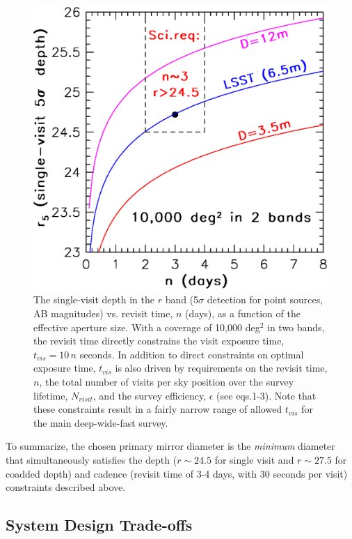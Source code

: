 \documentclass{emulateapj}
\begin{document}
\begin{figure}[t]
\includegraphics[width=1.0\hsize,clip]{singleDepth.ps}
\caption{The single-visit depth in the $r$ band (5$\sigma$ detection for 
point sources, AB magnitudes) vs. revisit time, $n$ (days), as a function of 
the effective aperture size. With a coverage of 10,000 deg$^2$ in two bands, 
the revisit time directly constrains the visit exposure time, $t_{vis}=10\,n$ 
seconds. In addition to direct constraints on optimal exposure time, $t_{vis}$ 
is also driven by requirements on the revisit time, $n$, the total number of visits 
per sky position over the survey lifetime, $N_{visit}$, and the survey efficiency,
$\epsilon$ (see eqs.1-3). Note that these constraints result in a fairly narrow range of 
allowed $t_{vis}$ for the main deep-wide-fast survey.} 
\label{Fig:singleDepth}
\end{figure}

To summarize, the chosen primary mirror diameter is the {\it minimum}
diameter that simultaneously satisfies the depth ($r\sim24.5$ for single visit and 
$r\sim27.5$ for coadded depth) and cadence (revisit time of 3-4 days, 
with 30 seconds per visit) constraints described above.

\subsection{System Design Trade-offs}
\end{document}
